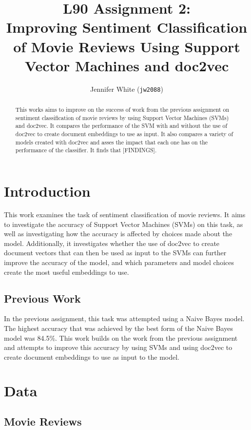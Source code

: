 \documentclass[twocolumn]{article}
\title{ L90 Assignment 2:\\
	Improving Sentiment Classification of Movie Reviews Using Support Vector Machines and doc2vec }
\author{Jennifer White (\texttt{jw2088})}
\begin{document}
\maketitle
\begin{abstract}
This works aims to improve on the success of work from the previous assignment on sentiment classification of movie reviews by using Support Vector Machines (SVMs) and doc2vec. It compares the performance of the SVM with and without the use of doc2vec to create document embeddings to use as input. It also compares a variety of models created with doc2vec and asses the impact that each one has on the performance of the classifier. It finds that [FINDINGS].
\end{abstract}

\section{Introduction}

This work examines the task of sentiment classification of movie reviews. It aims to investigate the accuracy of Support Vector Machines (SVMs) on this task, as well as investigating how the accuracy is affected by choices made about the model. Additionally, it investigates whether the use of doc2vec to create document vectors that can then be used as input to the SVMs can further improve the accuracy of the model, and which parameters and model choices create the most useful embeddings to use.

\subsection{Previous Work}

In the previous assignment, this task was attempted using a Naive Bayes model. The highest accuracy that was achieved by the best form of the Naive Bayes model was 84.5\%. This work builds on the work from the previous assignment and attempts to improve this accuracy by using SVMs and using doc2vec to create document embeddings to use as input to the model.

\section{Data}

\subsection{Movie Reviews}
\end{document}
